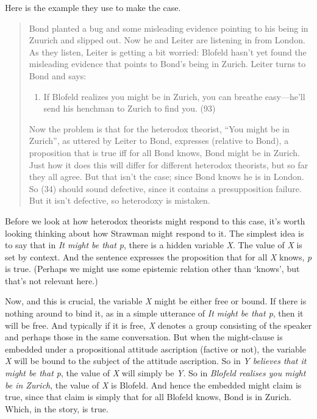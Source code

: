 \documentclass[
  11pt,
  letterpaper,
  DIV=11,
  numbers=noendperiod,
  twoside]{scrartcl}
\providecommand{\tightlist}{%
  \setlength{\itemsep}{0pt}\setlength{\parskip}{0pt}}
\begin{document}
Here is the example they use to make the case.

\begin{quote}
Bond planted a bug and some misleading evidence pointing to his being in
Zuurich and slipped out. Now he and Leiter are listening in from London.
As they listen, Leiter is getting a bit worried: Blofeld hasn't yet
found the misleading evidence that points to Bond's being in Zurich.
Leiter turns to Bond and says:

\begin{enumerate}
\def\labelenumi{\arabic{enumi}.}
\tightlist
\item
  If Blofeld realizes you might be in Zurich, you can breathe
  easy---he'll send his henchman to Zurich to find you. (93)
\end{enumerate}

Now the problem is that for the heterodox theorist, ``You might be in
Zurich'', as uttered by Leiter to Bond, expresses (relative to Bond), a
proposition that is true iff for all Bond knows, Bond might be in
Zurich. Just how it does this will differ for different heterodox
theorists, but so far they all agree. But that isn't the case; since
Bond knows he is in London. So (34) should sound defective, since it
contains a presupposition failure. But it isn't defective, so heterodoxy
is mistaken.
\end{quote}

Before we look at how heterodox theorists might respond to this case,
it's worth looking thinking about how Strawman might respond to it. The
simplest idea is to say that in \emph{It might be that p}, there is a
hidden variable \emph{X}. The value of \emph{X} is set by context. And
the sentence expresses the proposition that for all \emph{X} knows,
\emph{p} is true. (Perhaps we might use some epistemic relation other
than `knows', but that's not relevant here.)

Now, and this is crucial, the variable \emph{X} might be either free or
bound. If there is nothing around to bind it, as in a simple utterance
of \emph{It might be that p}, then it will be free. And typically if it
is free, \emph{X} denotes a group consisting of the speaker and perhaps
those in the same conversation. But when the might-clause is embedded
under a propositional attitude ascription (factive or not), the variable
\emph{X} will be bound to the subject of the attitude ascription. So in
\emph{Y believes that it might be that p}, the value of \emph{X} will
simply be \emph{Y}. So in \emph{Blofeld realises you might be in
Zurich}, the value of \emph{X} is Blofeld. And hence the embedded might
claim is true, since that claim is simply that for all Blofeld knows,
Bond is in Zurich. Which, in the story, is true.
\end{document}

